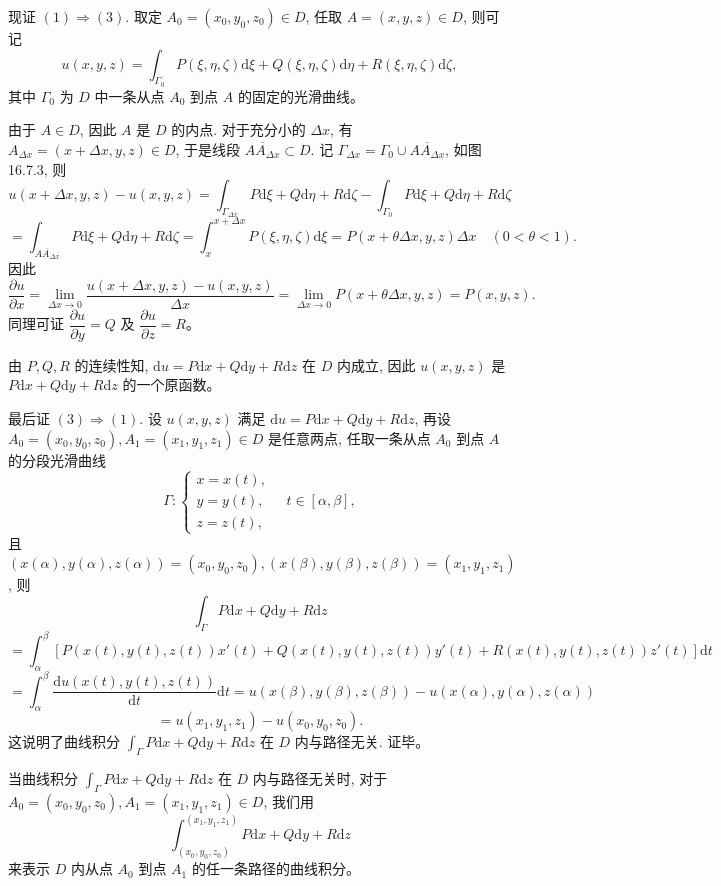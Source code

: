 \documentclass[UTF8, 12pt, fontset=fandol, oneside]{ctexart}
\begin{document}
现证 $(1)\Rightarrow(3)$. 取定 $A_0=(x_0,y_0,z_0)\in D$, 任取 $A=(x,y,z)\in D$, 则可记
\[
  u(x,y,z)=\int_{\Gamma_0}P(\xi,\eta,\zeta)\mathrm d\xi
  +Q(\xi,\eta,\zeta)\mathrm d\eta
  +R(\xi,\eta,\zeta)\mathrm d\zeta,
\]
其中 $\Gamma_0$ 为 $D$ 中一条从点 $A_0$ 到点 $A$ 的固定的光滑曲线。

由于 $A\in D$, 因此 $A$ 是 $D$ 的内点. 对于充分小的 $\Delta x$, 有 $A_{\Delta x}=(x+\Delta x,y,z)\in D$, 于是线段 $\overline{AA_{\Delta x}}\subset D$. 记 $\Gamma_{\Delta x}=\Gamma_0\cup\overline{AA_{\Delta x}}$, 如图 16.7.3, 则
\[
  u(x+\Delta x,y,z)-u(x,y,z)
  =
  \int_{\Gamma_{\Delta x}}P\mathrm d\xi+Q\mathrm d\eta+R\mathrm d\zeta
  -\int_{\Gamma_0}P\mathrm d\xi+Q\mathrm d\eta+R\mathrm d\zeta
\]
\[
  =\int_{\overline{AA_{\Delta x}}}P\mathrm d\xi+Q\mathrm d\eta+R\mathrm d\zeta
  =\int_x^{x+\Delta x}P(\xi,\eta,\zeta)\mathrm d\xi
  =P(x+\theta\Delta x,y,z)\Delta x\quad(0<\theta<1).
\]
因此
\[
  \frac{\partial u}{\partial x}
  =\lim_{\Delta x\to0}\frac{u(x+\Delta x,y,z)-u(x,y,z)}{\Delta x}
  =\lim_{\Delta x\to0}P(x+\theta\Delta x,y,z)=P(x,y,z).
\]
同理可证 $\dfrac{\partial u}{\partial y}=Q$ 及 $\dfrac{\partial u}{\partial z}=R$。

由 $P,Q,R$ 的连续性知, $\mathrm du=P\mathrm dx+Q\mathrm dy+R\mathrm dz$ 在 $D$ 内成立, 因此 $u(x,y,z)$ 是 $P\mathrm dx+Q\mathrm dy+R\mathrm dz$ 的一个原函数。

最后证 $(3)\Rightarrow(1)$. 设 $u(x,y,z)$ 满足 $\mathrm du=P\mathrm dx+Q\mathrm dy+R\mathrm dz$, 再设 $A_0=(x_0,y_0,z_0),A_1=(x_1,y_1,z_1)\in D$ 是任意两点, 任取一条从点 $A_0$ 到点 $A$ 的分段光滑曲线
\[
  \Gamma:\begin{cases}
    x=x(t),\\
    y=y(t),\\
    z=z(t),
  \end{cases}\quad t\in[\alpha,\beta],
\]
且 $(x(\alpha),y(\alpha),z(\alpha))=(x_0,y_0,z_0),(x(\beta),y(\beta),z(\beta))=(x_1,y_1,z_1)$, 则
\[
  \int_\Gamma P\mathrm dx+Q\mathrm dy+R\mathrm dz
\]
\[
  =\int_\alpha^\beta
  [P(x(t),y(t),z(t))x'(t)+Q(x(t),y(t),z(t))y'(t)
  +R(x(t),y(t),z(t))z'(t)]\mathrm dt
\]
\[
  =\int_\alpha^\beta\frac{\mathrm du(x(t),y(t),z(t))}{\mathrm dt}\mathrm dt
  =u(x(\beta),y(\beta),z(\beta))-u(x(\alpha),y(\alpha),z(\alpha))
\]
\[
  =u(x_1,y_1,z_1)-u(x_0,y_0,z_0).
\]
这说明了曲线积分 $\int_\Gamma P\mathrm dx+Q\mathrm dy+R\mathrm dz$ 在 $D$ 内与路径无关. 证毕。

当曲线积分 $\int_\Gamma P\mathrm dx+Q\mathrm dy+R\mathrm dz$ 在 $D$ 内与路径无关时, 对于 $A_0=(x_0,y_0,z_0),A_1=(x_1,y_1,z_1)\in D$, 我们用
\[
  \int_{(x_0,y_0,z_0)}^{(x_1,y_1,z_1)}P\mathrm dx+Q\mathrm dy+R\mathrm dz
\]
来表示 $D$ 内从点 $A_0$ 到点 $A_1$ 的任一条路径的曲线积分。
\end{document}
